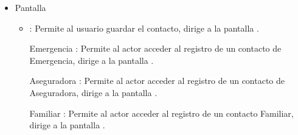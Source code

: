 \begin{itemize}
        \item Pantalla 
        
        \begin{itemize}
            \item {}: Permite al usuario guardar el contacto, dirige a la pantalla .
            \item [Emergencia]: Permite al actor acceder al registro de un contacto de Emergencia, dirige a la pantalla .
            \item [Aseguradora]: Permite al actor acceder al registro de un contacto de Aseguradora, dirige a la pantalla .
            \item [Familiar]: Permite al actor acceder al registro de un contacto Familiar, dirige a la pantalla . 
        \end{itemize}
    \end{itemize}
